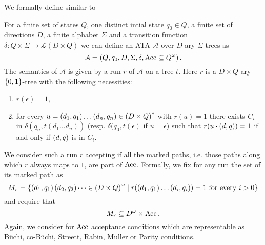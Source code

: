 We formally define similar to \cite{SynProbEnv}
\begin{definition}
  For a finite set of states $Q$, one distinct intial state $q_{0}\in Q$, a
  finite set of directions $D$, a finite alphabet $\Sigma$ and a transition
  function $\delta:Q\times\Sigma\rightarrow\mathcal{L}(D\times Q)$ we can
  define an \ac{ATA} $\mathcal{A}$ over $D$-ary $\Sigma$-trees as
  \begin{equation*}
    \mathcal{A} = \left(Q, q_{0}, D, \Sigma, \delta, \operatorname{Acc}\subseteq Q^{\omega}\right).
  \end{equation*}
  The semantics of $\mathcal{A}$ is given by a run $r$ of $\mathcal{A}$ on a
  tree $t$. Here $r$ is a $D\times Q$-ary $\left\{0,1\right\}$-tree with the following
  necessities:
  \begin{enumerate}
    \item $r(\epsilon) = 1$,
    \item for every $u = \left(d_{1}, q_{1}\right)\dots\left(d_{n}, q_{n}\right)\in
      \left(D\times Q\right)^{*}$ with $r(u) = 1$ there exists $C_{i}$ in
      $\delta(q_{n}, t(d_{1}\dots d_{n}))$ (resp. $\delta(q_{0}, t(\epsilon)$
      if $u = \epsilon$) such that $r(u\cdot\left(d,q\right)) = 1$ if and only if
      $\left(d,q\right)$ is in $C_{i}$.
  \end{enumerate}
  We consider such a run $r$ accepting if all the marked paths, i.e. those
  paths along which $r$ always maps to $1$, are part of $\operatorname{Acc}$. Formally, we
  fix for any run the set of its marked path as
  \begin{equation*}
  M_{r} = \left\{\left(d_{1}, q_{1}\right)\left(d_{2}, q_{2}\right)\dots\in
    \left(D\times Q\right)^{\omega}\mid r(\left(d_{1}, q_{1}\right)\dots
  \left(d_{i}, q_{i}\right)) = 1 \text{ for every }i>0\right\}
  \end{equation*}
  and require that
  \begin{equation*}
    M_{r}\subseteq D^{\omega}\times\operatorname{Acc}.
  \end{equation*}
  Again, we consider for $\operatorname{Acc}$ acceptance conditions which are representable
  as Büchi, co-Büchi, Streett, Rabin, Muller or Parity conditions.
\end{definition}

